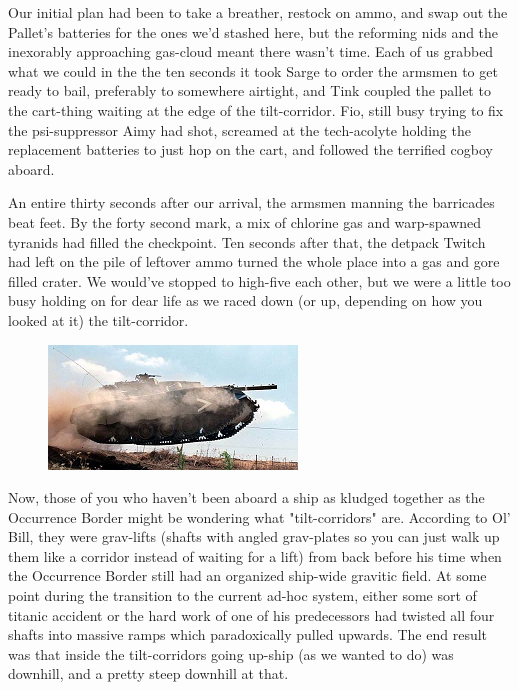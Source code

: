Our initial plan had been to take a breather, restock on ammo, and swap out the Pallet's batteries for the ones we'd stashed here, but the reforming nids and the inexorably approaching gas-cloud meant there wasn't time. 
Each of us grabbed what we could in the the ten seconds it took Sarge to order the armsmen to get ready to bail, preferably to somewhere airtight, and Tink coupled the pallet to the cart-thing waiting at the edge of the tilt-corridor. 
Fio, still busy trying to fix the psi-suppressor Aimy had shot, screamed at the tech-acolyte holding the replacement batteries to just hop on the cart, and followed the terrified cogboy aboard. 


An entire thirty seconds after our arrival, the armsmen manning the barricades beat feet. 
By the forty second mark, a mix of chlorine gas and warp-spawned tyranids had filled the checkpoint. 
Ten seconds after that, the detpack Twitch had left on the pile of leftover ammo turned the whole place into a gas and gore filled crater. 
We would've stopped to high-five each other, but we were a little too busy holding on for dear life as we raced down (or up, depending on how you looked at it) the tilt-corridor.

\begin{figure}
	\begin{center}
		\includegraphics[width=\figwidth]{pics/15/54.png}
	\end{center}
\end{figure}
Now, those of you who haven't been aboard a ship as kludged together as the Occurrence Border might be wondering what "tilt-corridors" are. 
According to Ol' Bill, they were grav-lifts (shafts with angled grav-plates so you can just walk up them like a corridor instead of waiting for a lift) from back before his time when the Occurrence Border still had an organized ship-wide gravitic field. 
At some point during the transition to the current ad-hoc system, either some sort of titanic accident or the hard work of one of his predecessors had twisted all four shafts into massive ramps which paradoxically pulled upwards. 
The end result was that inside the tilt-corridors going up-ship (as we wanted to do) was downhill, and a pretty steep downhill at that.

